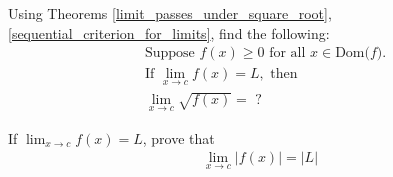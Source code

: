 \begin{exercise}
Using Theorems \ref{limit_passes_under_square_root}, \ref{sequential_criterion_for_limits}, find the following:
\begin{align*}
    &\text{Suppose} \hspace{4pt} f(x) \geq 0 \hspace{4pt} \text{for all} \hspace{4pt} x \in \text{Dom($f$)}.\\[2ex]
    &\text{If} \hspace{4pt} \lim_{x \longrightarrow c} f(x) = L, \hspace{4pt} \text{then}\\[2ex]
    &\lim_{x \longrightarrow c} \sqrt{f(x)} = \hspace{4pt} ?
\end{align*}
\end{exercise}

\begin{exercise}
If $\lim_{x \longrightarrow c} f(x) = L$, prove that 
\begin{align*}
    \lim_{x \longrightarrow c} \lvert f(x) \rvert = \lvert L \rvert 
\end{align*}
\end{exercise}